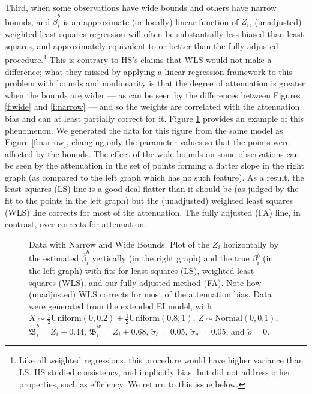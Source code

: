 \documentclass[11pt,titlepage]{article}
\newcommand{\bbeta}{{\mathfrak B}}
\newcommand{\sigmau}{\breve{\sigma}}
\newcommand{\rhou}{\breve{\rho}}
\begin{document}
Third, when some observations have wide bounds and others have narrow
bounds, and $\hat\beta_i^b$ is an approximate (or locally) linear
function of $Z_i$, (unadjusted) weighted least squares regression will
often be substantially less biased than least squares, and
approximately equivalent to or better than the fully adjusted
procedure.\footnote{Like all weighted regressions, this procedure
  would have higher variance than LS. HS studied consistency, and
  implicitly bias, but did not address other properties, such as
  efficiency.  We return to this issue below.}  This is contrary to
HS's claims that WLS would not make a difference; what they missed by
applying a linear regression framework to this problem with bounds and
nonlinearity is that the degree of attenuation is greater when the
bounds are wider --- as can be seen by the differences between Figures
\ref{f:wide} and \ref{f:narrow} --- and so the weights are correlated
with the attenuation bias and can at least partially correct for it.
Figure \ref{f:mixed} provides an example of this phenomenon.  We
generated the data for this figure from the same model as Figure
\ref{f:narrow}, changing only the parameter values so that the points
were affected by the bounds.  The effect of the wide bounds on some
observations can be seen by the attenuation in the set of points
forming a flatter slope in the right graph (as compared to the left
graph which has no such feature).  As a result, the least squares (LS)
line is a good deal flatter than it should be (as judged by the fit to
the points in the left graph) but the (unadjusted) weighted least
squares (WLS) line corrects for most of the attenuation.  The fully
adjusted (FA) line, in contrast, over-corrects for attenuation.
\begin{figure}[t]
  \begin{center}
    \caption{Data with Narrow and Wide Bounds. Plot of the $Z_i$ 
      horizontally by the estimated $\hat\beta_i^b$ vertically (in the
      right graph) and the true $\beta_i^b$ (in the left graph) with
      fits for least squares (LS), weighted least squares (WLS), and
      our fully adjusted method (FA).  Note how (unadjusted) WLS
      corrects for most of the attenuation bias.  Data were generated
      from the extended EI model, with $X \sim
      \frac{1}{2}\textrm{Uniform}(0,0.2) +
      \frac{1}{2}\textrm{Uniform}(0.8,1)$, $Z \sim
      \textrm{Normal}(0,0.1)$, $\breve\bbeta_i^b = Z_i + 0.44$,
      $\breve\bbeta_i^w = Z_i + 0.68$, $\sigmau_b = 0.05$, $\sigmau_w
      = 0.05$, and $\rhou = 0$.}
    \label{f:mixed}
  \end{center}
\end{figure}
\end{document}
